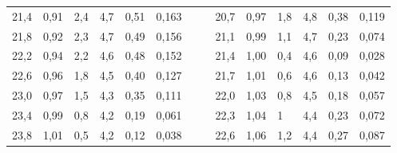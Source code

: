 \documentclass{article}
\begin{document}
\begin{center}
\begin{tabular}{|l|l|l|l|l|l|llllllll}
    21,4                          & 0,91                         & 2,4    & 4,7      & 0,51     & 0,163        &  & \multicolumn{1}{l|}{} & \multicolumn{1}{l|}{20,7}    & \multicolumn{1}{l|}{0,97}    & \multicolumn{1}{l|}{1,8}    & \multicolumn{1}{l|}{4,8}      & \multicolumn{1}{l|}{0,38}     & \multicolumn{1}{l|}{0,119}        \\ \cline{1-6} \cline{9-14} 
    21,8                          & 0,92                         & 2,3    & 4,7      & 0,49     & 0,156        &  & \multicolumn{1}{l|}{} & \multicolumn{1}{l|}{21,1}    & \multicolumn{1}{l|}{0,99}    & \multicolumn{1}{l|}{1,1}    & \multicolumn{1}{l|}{4,7}      & \multicolumn{1}{l|}{0,23}     & \multicolumn{1}{l|}{0,074}        \\ \cline{1-6} \cline{9-14} 
    22,2                          & 0,94                         & 2,2    & 4,6      & 0,48     & 0,152        &  & \multicolumn{1}{l|}{} & \multicolumn{1}{l|}{21,4}    & \multicolumn{1}{l|}{1,00}    & \multicolumn{1}{l|}{0,4}    & \multicolumn{1}{l|}{4,6}      & \multicolumn{1}{l|}{0,09}     & \multicolumn{1}{l|}{0,028}        \\ \cline{1-6} \cline{9-14} 
    22,6                          & 0,96                         & 1,8    & 4,5      & 0,40     & 0,127        &  & \multicolumn{1}{l|}{} & \multicolumn{1}{l|}{21,7}    & \multicolumn{1}{l|}{1,01}    & \multicolumn{1}{l|}{0,6}    & \multicolumn{1}{l|}{4,6}      & \multicolumn{1}{l|}{0,13}     & \multicolumn{1}{l|}{0,042}        \\ \cline{1-6} \cline{9-14} 
    23,0                          & 0,97                         & 1,5    & 4,3      & 0,35     & 0,111        &  & \multicolumn{1}{l|}{} & \multicolumn{1}{l|}{22,0}    & \multicolumn{1}{l|}{1,03}    & \multicolumn{1}{l|}{0,8}    & \multicolumn{1}{l|}{4,5}      & \multicolumn{1}{l|}{0,18}     & \multicolumn{1}{l|}{0,057}        \\ \cline{1-6} \cline{9-14} 
    23,4                          & 0,99                         & 0,8    & 4,2      & 0,19     & 0,061        &  & \multicolumn{1}{l|}{} & \multicolumn{1}{l|}{22,3}    & \multicolumn{1}{l|}{1,04}    & \multicolumn{1}{l|}{1}      & \multicolumn{1}{l|}{4,4}      & \multicolumn{1}{l|}{0,23}     & \multicolumn{1}{l|}{0,072}        \\ \cline{1-6} \cline{9-14} 
    23,8                          & 1,01                         & 0,5    & 4,2      & 0,12     & 0,038        &  & \multicolumn{1}{l|}{} & \multicolumn{1}{l|}{22,6}    & \multicolumn{1}{l|}{1,06}    & \multicolumn{1}{l|}{1,2}    & \multicolumn{1}{l|}{4,4}      & \multicolumn{1}{l|}{0,27}     & \multicolumn{1}{l|}{0,087}        \\ \cline{1-6} \cline{9-14} 

\end{tabular}
\end{center}
\end{document}
